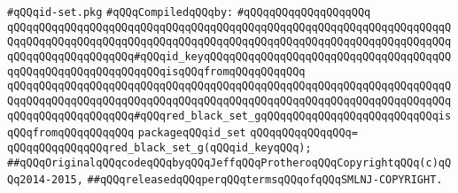 \label{src/lib/src/id-set.pkg}
\verb|#qQQqid-set.pkg|\newline
\newline
\verb|#qQQqCompiledqQQqby:|\newline
\verb|#qQQqqQQqqQQqqQQqqQQq|\newline
\newline
\verb|qQQqqQQqqQQqqQQqqQQqqQQqqQQqqQQqqQQqqQQqqQQqqQQqqQQqqQQqqQQqqQQqqQQqqQQqqQQqqQQqqQQqqQQqqQQqqQQqqQQqqQQqqQQqqQQqqQQqqQQqqQQqqQQqqQQqqQQqqQQqqQQqqQQqqQQqqQQqqQQq#qQQqid_keyqQQqqQQqqQQqqQQqqQQqqQQqqQQqqQQqqQQqqQQqqQQqqQQqqQQqqQQqqQQqqQQqisqQQqfromqQQqqQQqqQQq|\newline
\verb|qQQqqQQqqQQqqQQqqQQqqQQqqQQqqQQqqQQqqQQqqQQqqQQqqQQqqQQqqQQqqQQqqQQqqQQqqQQqqQQqqQQqqQQqqQQqqQQqqQQqqQQqqQQqqQQqqQQqqQQqqQQqqQQqqQQqqQQqqQQqqQQqqQQqqQQqqQQqqQQq#qQQqred_black_set_gqQQqqQQqqQQqqQQqqQQqqQQqqQQqisqQQqfromqQQqqQQqqQQq|\newline
\verb|packageqQQqid_set|\newline
\verb|qQQqqQQqqQQqqQQq=|\newline
\verb|qQQqqQQqqQQqqQQqred_black_set_g(qQQqid_keyqQQq);|\newline
\newline
\newline
\verb|##qQQqOriginalqQQqcodeqQQqbyqQQqJeffqQQqProtheroqQQqCopyrightqQQq(c)qQQq2014-2015,|\newline
\verb|##qQQqreleasedqQQqperqQQqtermsqQQqofqQQqSMLNJ-COPYRIGHT.|\newline

